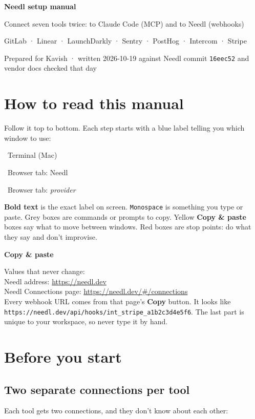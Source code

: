 \documentclass[11pt,a4paper]{article}
\newcommand{\ui}[1]{\textbf{#1}}
\newcommand{\where}[1]{\par\smallskip\noindent\colorbox{winbg}{\color{winfg}\bfseries\strut\ #1\ }\par\nopagebreak[4]}
\newcommand{\lit}[1]{\texttt{#1}}
\newenvironment{xfer}{\def\FrameCommand{\fboxsep=6pt\colorbox{xferbg}}\MakeFramed{\advance\hsize-\width\FrameRestore}\textbf{Copy \& paste}\par}{\endMakeFramed}
\begin{document}
\begin{center}
{\LARGE\bfseries Needl setup manual}\par\medskip
{\large Connect seven tools twice: to Claude Code (MCP) and to Needl (webhooks)}\par\medskip
{\normalsize GitLab · Linear · LaunchDarkly · Sentry · PostHog · Intercom · Stripe}\par\smallskip
{\small Prepared for Kavish · written 2026-10-19 against Needl commit \lit{16eec52} and vendor docs checked that day}
\end{center}

\section*{How to read this manual}
Follow it top to bottom. Each step starts with a blue label telling you which window to use:

\where{Terminal (Mac)}
\where{Browser tab: Needl}
\where{Browser tab: \textit{provider}}

\ui{Bold text} is the exact label on screen. \lit{Monospace} is something you type or paste. Grey boxes are commands or prompts to copy. Yellow \textbf{Copy \& paste} boxes say what to move between windows. Red boxes are stop points: do what they say and don't improvise.

\begin{xfer}
Values that never change:\\
Needl address: \url{https://needl.dev}\\
Needl Connections page: \url{https://needl.dev/#/connections}\\
Every webhook URL comes from that page's \ui{Copy} button. It looks like \lit{https://needl.dev/api/hooks/int\_stripe\_a1b2c3d4e5f6}. The last part is unique to your workspace, so never type it by hand.
\end{xfer}

\begingroup\setlength{\parskip}{0pt}\makeatletter{}\makeatother
\tableofcontents
\endgroup

\clearpage
\section{Before you start}

\subsection{Two separate connections per tool}
Each tool gets two connections, and they don't know about each other:
\end{document}
